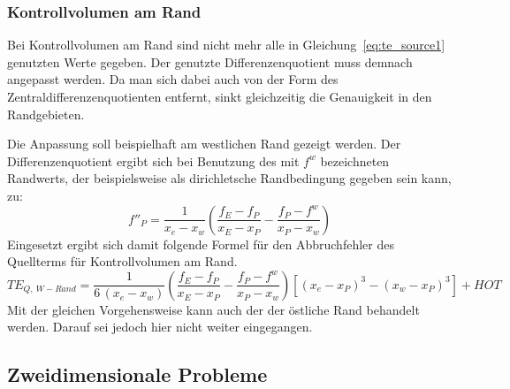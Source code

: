 \subsubsection{Kontrollvolumen am Rand}

Bei Kontrollvolumen am Rand sind nicht mehr alle in Gleichung~\ref{eq:te_source1}
genutzten Werte gegeben. Der genutzte Differenzenquotient muss demnach angepasst werden.
Da man sich dabei auch von der Form des Zentraldifferenzenquotienten entfernt,
sinkt gleichzeitig die Genauigkeit in den Randgebieten.

Die Anpassung soll beispielhaft am westlichen Rand gezeigt werden. Der Differenzenquotient
ergibt sich bei Benutzung des mit $f^w$ bezeichneten Randwerts, der beispielsweise als
dirichletsche Randbedingung gegeben sein kann, zu:
\begin{equation}
  f''_P = \frac{1}{x_e-x_w}\left(\frac{f_E-f_P}{x_E-x_P}-\frac{f_P-f^w}{x_P-x_w}\right)
\end{equation}
Eingesetzt ergibt sich damit folgende Formel für den Abbruchfehler des Quellterms
für Kontrollvolumen am Rand.
\begin{equation}
  TE_{Q,\ W-Rand} =
\frac{1}{6\,(x_e-x_w)}\left(\frac{f_E-f_P}{x_E-x_P}-\frac{f_P-f^w}{x_P-x_w}\right)
  \left[{{(x_e-x_P)}^3-{(x_w-x_P)}^3}\right] + HOT
\end{equation}
Mit der gleichen Vorgehensweise kann auch der der östliche Rand behandelt werden. Darauf
sei jedoch hier nicht weiter eingegangen.



\subsection{Zweidimensionale Probleme}



